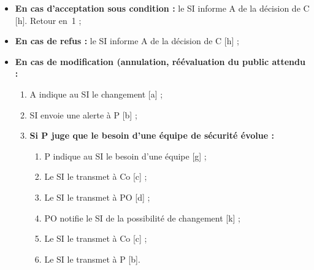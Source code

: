 \begin{enumerate}
\begin{itemize}
	\item \textbf{En cas d'acceptation sous condition :}
	              le SI informe A de la décision de C [h]. Retour en~1 ;
	\item \textbf{En cas de refus :} le SI informe A de la décision de C [h] ;
	\item \textbf{En cas de modification (annulation, réévaluation du public attendu :}
	\begin{enumerate}
		\item A indique au SI le changement [a] ;
		\item SI envoie une alerte à P [b] ;
		\item \textbf{Si P juge que le besoin d'une équipe de sécurité évolue :}
		\begin{enumerate}
			\item P indique au SI le besoin d'une équipe [g] ;
			\item Le SI le transmet à Co [c] ;
			\item Le SI le transmet à PO [d] ;
			\item PO notifie le SI de la possibilité de changement [k] ;
			\item Le SI le transmet à Co [c] ;
			\item Le SI le transmet à P [b].
		\end{enumerate}
	\end{enumerate}

\end{itemize}
\end{enumerate}
